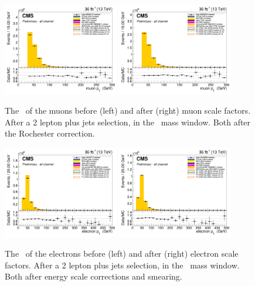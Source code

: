 \begin{figure}[htbp]
	\centering
	\includegraphics[width=0.45\textwidth]{5_Eventselection/Figures/Reweighing/muon/2lepcontrol_afterAtLeast1Jet_afterZWindow_MuPt_all_Stack_before}
	\includegraphics[width=0.45\textwidth]{5_Eventselection/Figures/Reweighing/muon/2lepcontrol_afterAtLeast1Jet_afterZWindow_MuPt_all_Stack_after}
	\caption{The \pt\ of the muons before (left) and after (right) muon scale factors. After a 2 lepton plus jets selection, in the \PZ\ mass window. Both after the Rochester correction.}
	\label{fig:muSF}
\end{figure}
\begin{figure}[htbp]
	\centering
	\includegraphics[width=0.45\textwidth]{5_Eventselection/Figures/Reweighing/electron/2lepcontrol_afterAtLeast1Jet_afterZWindow_ElPt_all_Stack_before}
	\includegraphics[width=0.45\textwidth]{5_Eventselection/Figures/Reweighing/electron/2lepcontrol_afterAtLeast1Jet_afterZWindow_ElPt_all_Stack_after}
	\caption{The \pt\ of the electrons before (left) and after (right) electron scale factors. After a 2 lepton plus jets selection, in the \PZ\ mass window. Both after energy scale corrections and smearing.}
	\label{fig:elSF}
\end{figure}

